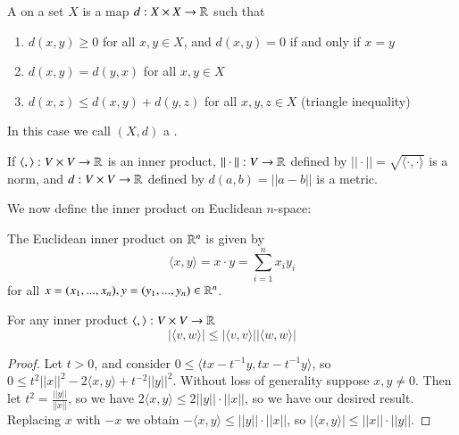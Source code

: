\begin{defn}
    A  on a set $X$ is a map $d:X\times X\rightarrow \mathbb R$ such that \begin{enumerate}
        \item $d(x,y) \geq 0$ for all $x,y \in X$, and $d(x,y) = 0$ if and only if $x=y$
        \item $d(x,y) = d(y,x)$ for all $x,y \in X$
        \item $d(x,z) \leq d(x,y)+d(y,z)$ for all $x,y,z \in X$ (triangle inequality)
    \end{enumerate}
    In this case we call $(X,d)$ a .
\end{defn}

\begin{prop}
    If $\langle ,\rangle:V\times V\rightarrow \mathbb R$ is an inner product, $||\cdot ||:V\rightarrow \mathbb R$ defined by $||\cdot || = \sqrt{\langle \cdot,\cdot\rangle}$ is a norm, and $d:V\times V\rightarrow \mathbb R$ defined by $d(a,b) = ||a-b||$ is a metric.
\end{prop}

We now define the inner product on Euclidean $n$-space:

\begin{defn}
    The Euclidean inner product on $\mathbb R^n$ is given by \begin{equation*}
        \langle x,y\rangle = x\cdot y = \sum_{i=1}^nx_iy_i
    \end{equation*}
    for all $x = (x_1,...,x_n),y=(y_1,...,y_n) \in \mathbb R^n$.
\end{defn}

\begin{prop}
    For any inner product $\langle ,\rangle:V\times V\rightarrow \mathbb R$\begin{equation*}
        |\langle v,w\rangle|\leq |\langle v,v\rangle||\langle w,w\rangle|
    \end{equation*}
\end{prop}
\begin{proof}
    Let $t > 0$, and consider $0 \leq \langle tx-t^{-1}y,tx-t^{-1}y\rangle$, so $0 \leq t^2||x||^2-2\langle x,y\rangle + t^{-2}||y||^2$. Without loss of generality suppose $x,y \neq 0$. Then let $t^2 = \frac{||y||}{||x||}$, so we have $2\langle x,y\rangle \leq 2||y||\cdot||x||$, so we have our desired result. Replacing $x$ with $-x$ we obtain $-\langle x,y\rangle \leq ||y||\cdot||x||$, so $|\langle x,y\rangle| \leq ||x||\cdot ||y||$.
\end{proof}

